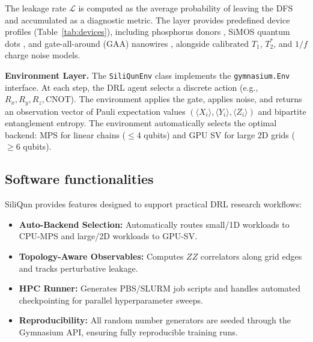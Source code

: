 \documentclass[preprint,12pt, a4paper]{elsarticle}
\begin{document}
The leakage rate $\mathcal{L}$ is computed as the average probability of leaving the DFS and accumulated as a diagnostic metric. The layer provides predefined device profiles (Table~\ref{tab:devices}), including phosphorus donors \cite{muhonen2014storing}, SiMOS quantum dots \cite{yoneda2018quantum}, and gate-all-around (GAA) nanowires \cite{geyer2022twoqubit}, alongside calibrated $T_1$, $T_2^*$, and $1/f$ charge noise models.

\begin{table}[htbp]
\centering
\caption{Built-in silicon spin qubit device profiles in SiliQun.}
\label{tab:devices}
\end{table}

\textbf{Environment Layer.} The \texttt{SiliQunEnv} class implements the \texttt{gymnasium.Env} interface. At each step, the DRL agent selects a discrete action (e.g., $R_x, R_y, R_z, \text{CNOT}$). The environment applies the gate, applies noise, and returns an observation vector of Pauli expectation values $(\langle X_i \rangle, \langle Y_i \rangle, \langle Z_i \rangle)$ and bipartite entanglement entropy. The environment automatically selects the optimal backend: MPS for linear chains ($\leq 4$ qubits) and GPU SV for large 2D grids ($\geq 6$ qubits).

\subsection{Software functionalities}

SiliQun provides features designed to support practical DRL research workflows:
\begin{itemize}
    \item \textbf{Auto-Backend Selection:} Automatically routes small/1D workloads to CPU-MPS and large/2D workloads to GPU-SV.
    \item \textbf{Topology-Aware Observables:} Computes $ZZ$ correlators along grid edges and tracks perturbative leakage.
    \item \textbf{HPC Runner:} Generates PBS/SLURM job scripts and handles automated checkpointing for parallel hyperparameter sweeps.
    \item \textbf{Reproducibility:} All random number generators are seeded through the Gymnasium API, ensuring fully reproducible training runs.
\end{itemize}
\end{document}
